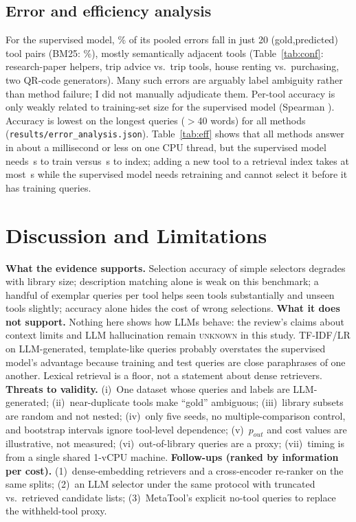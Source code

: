 \documentclass[10pt,twocolumn]{article}
\begin{document}
\subsection{Error and efficiency analysis}
For the supervised model, \XLRTopShare\% of its \XLRErr{} pooled errors fall in just 20 (gold,predicted) tool pairs (BM25: \XBMTopShare\%), mostly semantically adjacent tools (Table~\ref{tab:conf}: research-paper helpers, trip advice vs.\ trip tools, house renting vs.\ purchasing, two QR-code generators). Many such errors are arguably label ambiguity rather than method failure; I did not manually adjudicate them. Per-tool accuracy is only weakly related to training-set size for the supervised model (Spearman \XLRSpear). Accuracy is lowest on the longest queries ($>$40 words) for all methods (\texttt{results/error\_analysis.json}). Table~\ref{tab:eff} shows that all methods answer in about a millisecond or less on one CPU thread, but the supervised model needs \FLRFit\,s to train versus \FHybFit\,s to index; adding a new tool to a retrieval index takes at most \FHybFit{}\,s while the supervised model needs retraining and cannot select it before it has training queries.

\section{Discussion and Limitations}\label{sec:limits}
\textbf{What the evidence supports.} Selection accuracy of simple selectors degrades with library size; description matching alone is weak on this benchmark; a handful of exemplar queries per tool helps seen tools substantially and unseen tools slightly; accuracy alone hides the cost of wrong selections. \textbf{What it does not support.} Nothing here shows how LLMs behave: the review's claims about context limits and LLM hallucination remain \textsc{unknown} in this study. TF-IDF/LR on LLM-generated, template-like queries probably overstates the supervised model's advantage because training and test queries are close paraphrases of one another. Lexical retrieval is a floor, not a statement about dense retrievers. \textbf{Threats to validity.} (i)~One dataset whose queries and labels are LLM-generated; (ii)~near-duplicate tools make ``gold'' ambiguous; (iii)~library subsets are random and not nested; (iv)~only five seeds, no multiple-comparison control, and bootstrap intervals ignore tool-level dependence; (v)~$p_{out}$ and cost values are illustrative, not measured; (vi)~out-of-library queries are a proxy; (vii)~timing is from a single shared 1-vCPU machine. \textbf{Follow-ups (ranked by information per cost).} (1)~dense-embedding retrievers and a cross-encoder re-ranker on the same splits; (2)~an LLM selector under the same protocol with truncated vs.\ retrieved candidate lists; (3)~MetaTool's explicit no-tool queries to replace the withheld-tool proxy.
\end{document}
